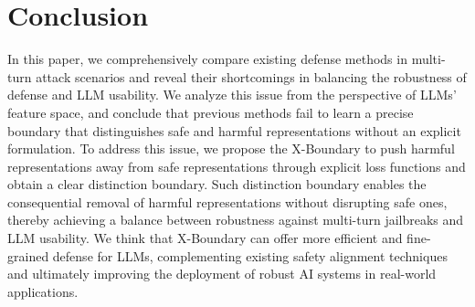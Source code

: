\section{Conclusion}
%
In this paper, we comprehensively compare existing defense methods in multi-turn attack scenarios and reveal their shortcomings in balancing the robustness of defense and LLM usability. 
%
We analyze this issue from the perspective of LLMs' feature space, and conclude that previous methods fail to learn a precise boundary that distinguishes safe and harmful representations without an explicit formulation.
%
To address this issue, we propose the X-Boundary to push harmful representations away from safe representations through explicit loss functions and obtain a clear distinction boundary. Such distinction boundary enables the consequential removal of harmful representations without disrupting safe ones, thereby achieving a balance between robustness against multi-turn jailbreaks and LLM usability.
%
%
We think that X-Boundary can offer more efficient and fine-grained defense for LLMs, complementing existing safety alignment techniques and ultimately improving the deployment of robust AI systems in real-world applications.
